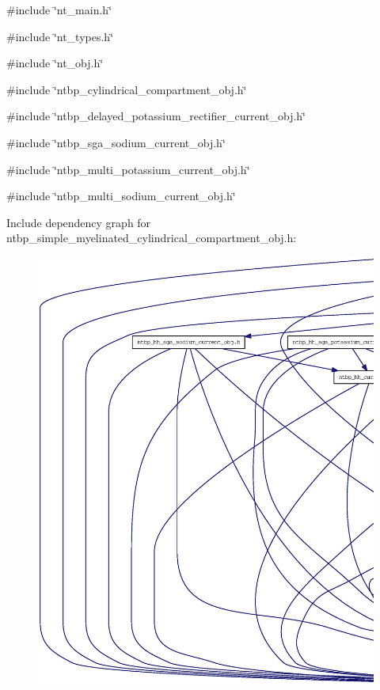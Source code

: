 {\ttfamily \#include \char`\"{}nt\_\-main.h\char`\"{}}\par
{\ttfamily \#include \char`\"{}nt\_\-types.h\char`\"{}}\par
{\ttfamily \#include \char`\"{}nt\_\-obj.h\char`\"{}}\par
{\ttfamily \#include \char`\"{}ntbp\_\-cylindrical\_\-compartment\_\-obj.h\char`\"{}}\par
{\ttfamily \#include \char`\"{}ntbp\_\-delayed\_\-potassium\_\-rectifier\_\-current\_\-obj.h\char`\"{}}\par
{\ttfamily \#include \char`\"{}ntbp\_\-sga\_\-sodium\_\-current\_\-obj.h\char`\"{}}\par
{\ttfamily \#include \char`\"{}ntbp\_\-multi\_\-potassium\_\-current\_\-obj.h\char`\"{}}\par
{\ttfamily \#include \char`\"{}ntbp\_\-multi\_\-sodium\_\-current\_\-obj.h\char`\"{}}\par
Include dependency graph for ntbp\_\-simple\_\-myelinated\_\-cylindrical\_\-compartment\_\-obj.h:
\nopagebreak
\begin{figure}[H]
\begin{center}
\leavevmode
\includegraphics[width=400pt]{ntbp__simple__myelinated__cylindrical__compartment__obj_8h__incl}
\end{center}
\end{figure}
